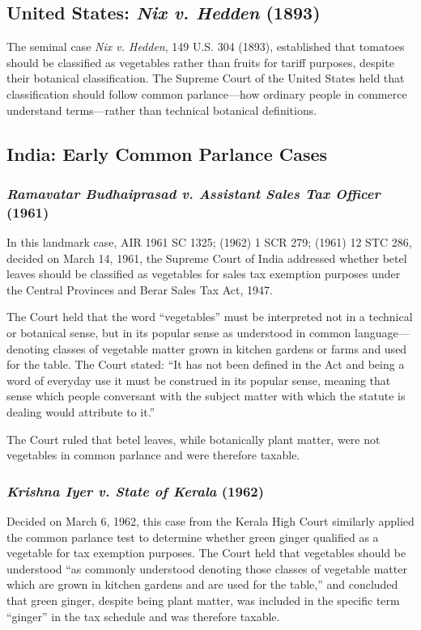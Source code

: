 \documentclass[12pt,a4paper]{article}
\begin{document}
\subsection{United States: \textit{Nix v. Hedden} (1893)}

The seminal case \textit{Nix v. Hedden}, 149 U.S. 304 (1893), established that tomatoes should be classified as vegetables rather than fruits for tariff purposes, despite their botanical classification. The Supreme Court of the United States held that classification should follow common parlance---how ordinary people in commerce understand terms---rather than technical botanical definitions.

\subsection{India: Early Common Parlance Cases}

\subsubsection{\textit{Ramavatar Budhaiprasad v. Assistant Sales Tax Officer} (1961)}

In this landmark case, AIR 1961 SC 1325; (1962) 1 SCR 279; (1961) 12 STC 286, decided on March 14, 1961, the Supreme Court of India addressed whether betel leaves should be classified as vegetables for sales tax exemption purposes under the Central Provinces and Berar Sales Tax Act, 1947.

The Court held that the word ``vegetables'' must be interpreted not in a technical or botanical sense, but in its popular sense as understood in common language---denoting classes of vegetable matter grown in kitchen gardens or farms and used for the table. The Court stated: ``It has not been defined in the Act and being a word of everyday use it must be construed in its popular sense, meaning that sense which people conversant with the subject matter with which the statute is dealing would attribute to it.''

The Court ruled that betel leaves, while botanically plant matter, were not vegetables in common parlance and were therefore taxable.

\subsubsection{\textit{Krishna Iyer v. State of Kerala} (1962)}

Decided on March 6, 1962, this case from the Kerala High Court similarly applied the common parlance test to determine whether green ginger qualified as a vegetable for tax exemption purposes. The Court held that vegetables should be understood ``as commonly understood denoting those classes of vegetable matter which are grown in kitchen gardens and are used for the table,'' and concluded that green ginger, despite being plant matter, was included in the specific term ``ginger'' in the tax schedule and was therefore taxable.
\end{document}
